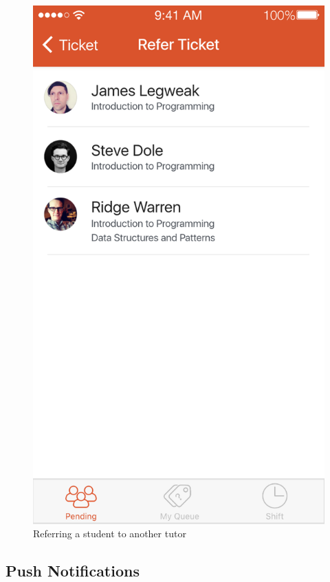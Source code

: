 \documentclass[a4paper,12pt]{article}
\begin{document}
\begin{figure}[p]
\centering
\includegraphics[scale=0.5]{91475c5923.png}
\caption{Referring a student to another tutor}
\label{9}
\end{figure}



\subsection{Push Notifications}\label{push-notifications}
\end{document}
